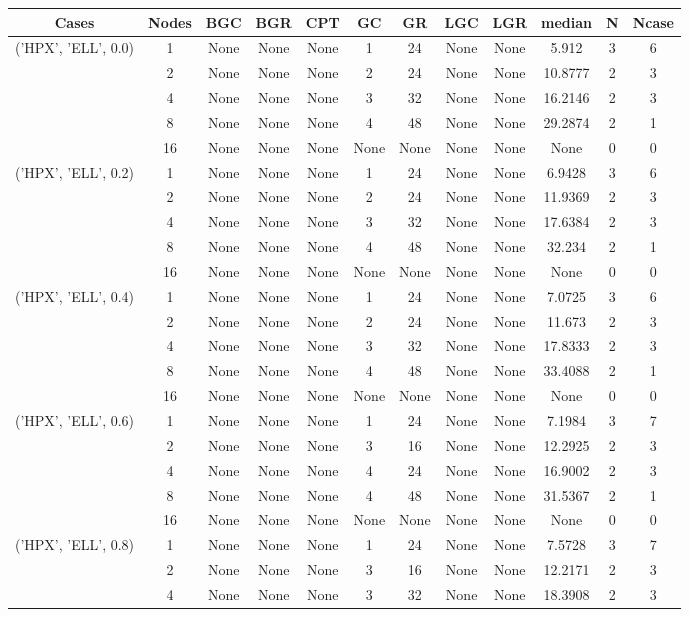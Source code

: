 \begin{tabular}{cccccccccccc}
\hline
Cases & Nodes& BGC& BGR& CPT& GC& GR& LGC& LGR& median & N & Ncase \\
\hline
\multirow{5}{*}{('HPX', 'ELL', 0.0)}& 1& None& None& None& 1& 24& None& None& 5.912& 3& 6\\
& 2& None& None& None& 2& 24& None& None& 10.8777& 2& 3\\
& 4& None& None& None& 3& 32& None& None& 16.2146& 2& 3\\
& 8& None& None& None& 4& 48& None& None& 29.2874& 2& 1\\
& 16& None& None& None& None& None& None& None& None& 0& 0\\
\hline
\multirow{5}{*}{('HPX', 'ELL', 0.2)}& 1& None& None& None& 1& 24& None& None& 6.9428& 3& 6\\
& 2& None& None& None& 2& 24& None& None& 11.9369& 2& 3\\
& 4& None& None& None& 3& 32& None& None& 17.6384& 2& 3\\
& 8& None& None& None& 4& 48& None& None& 32.234& 2& 1\\
& 16& None& None& None& None& None& None& None& None& 0& 0\\
\hline
\multirow{5}{*}{('HPX', 'ELL', 0.4)}& 1& None& None& None& 1& 24& None& None& 7.0725& 3& 6\\
& 2& None& None& None& 2& 24& None& None& 11.673& 2& 3\\
& 4& None& None& None& 3& 32& None& None& 17.8333& 2& 3\\
& 8& None& None& None& 4& 48& None& None& 33.4088& 2& 1\\
& 16& None& None& None& None& None& None& None& None& 0& 0\\
\hline
\multirow{5}{*}{('HPX', 'ELL', 0.6)}& 1& None& None& None& 1& 24& None& None& 7.1984& 3& 7\\
& 2& None& None& None& 3& 16& None& None& 12.2925& 2& 3\\
& 4& None& None& None& 4& 24& None& None& 16.9002& 2& 3\\
& 8& None& None& None& 4& 48& None& None& 31.5367& 2& 1\\
& 16& None& None& None& None& None& None& None& None& 0& 0\\
\hline
\multirow{5}{*}{('HPX', 'ELL', 0.8)}& 1& None& None& None& 1& 24& None& None& 7.5728& 3& 7\\
& 2& None& None& None& 3& 16& None& None& 12.2171& 2& 3\\
& 4& None& None& None& 3& 32& None& None& 18.3908& 2& 3\\

\end{tabular}
